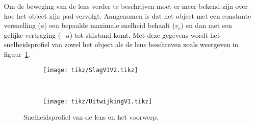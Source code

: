 Om de beweging van de lens verder te beschrijven moet er meer bekend zijn over hoe het object zijn pad vervolgt. Aangenomen is dat het object met een constante versnelling ($a$) een bepaalde maximale snelheid behaalt ($v_e$) en dan met een gelijke vertraging ($-a$) tot stilstand komt. Met deze gegevens wordt het snelheidsprofiel van zowel het object als de lens beschreven zoals weergeven in figuur~\ref{fig:Snelheidprofiel}.

\begin{figure}
\centering
\begin{subfigure}[t]{0.45\textwidth}
	\setlength\figureheight{5cm} 
	\setlength{}
	\texttt{[image: tikz/SlagV1V2.tikz]}
\end{subfigure}~
\begin{subfigure}[b]{0.45\textwidth}
	\setlength\figureheight{5cm} 
	\setlength{}
	\texttt{[image: tikz/UitwijkingV1.tikz]}
\end{subfigure}
\caption{Snelheidsprofiel van de lens en het voorwerp.}
\label{fig:Snelheidprofiel}
\end{figure}




